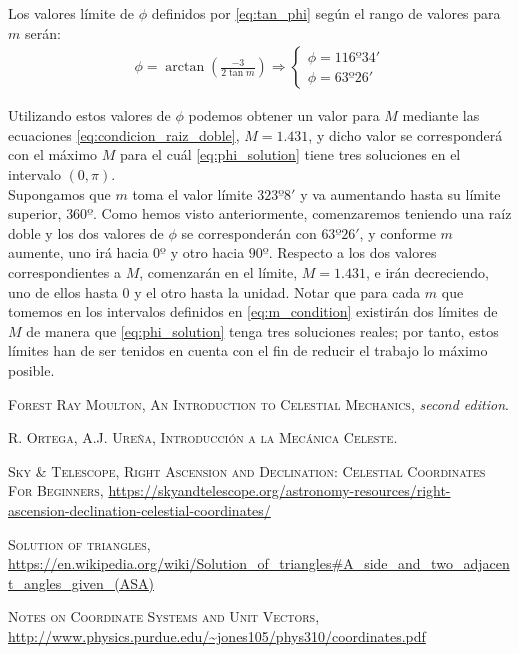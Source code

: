 \documentclass[11pt]{article}
\newcommand\ddfrac[2]{\frac{\displaystyle #1}{\displaystyle #2}}
\begin{document}
Los valores límite de $\phi$ definidos por \eqref{eq:tan_phi} según el rango de valores para $m$ serán:
\begin{align}
\phi=\arctan{(\ddfrac{-3}{2\tan{m}})} \Longrightarrow
\left\{
\begin{array}{l}
	\phi=116º34'\\
	\phi=63º26'
\end{array}
\right.
\end{align}

Utilizando estos valores de $\phi$ podemos obtener un valor para $M$ mediante las ecuaciones \eqref{eq:condicion_raiz_doble}, $M=1.431$, y dicho valor se corresponderá con el máximo $M$ para el cuál \eqref{eq:phi_solution} tiene tres soluciones en el intervalo $(0,\pi)$.\\

Supongamos que $m$ toma el valor límite $323º8'$ y va aumentando hasta su límite superior, $360º$. Como hemos visto anteriormente, comenzaremos teniendo una raíz doble y los dos valores de $\phi$ se corresponderán con $63º26'$, y conforme $m$ aumente, uno irá hacia $0º$ y otro hacia $90º$. Respecto a los dos valores correspondientes a $M$, comenzarán en el límite, $M=1.431$, e irán decreciendo, uno de ellos hasta $0$ y el otro hasta la unidad. Notar que para cada $m$ que tomemos en los intervalos definidos en \eqref{eq:m_condition} existirán dos límites de $M$ de manera que \eqref{eq:phi_solution} tenga tres soluciones reales; por tanto, estos límites han de ser tenidos en cuenta con el fin de reducir el trabajo lo máximo posible.\\













\newpage

\begin{thebibliography}{99}
 \textsc{Forest Ray Moulton}, \textsc{An Introduction to Celestial Mechanics}, \textit{second edition}.

 \textsc{R. Ortega, A.J. Ureña}, \textsc{Introducción a la Mecánica Celeste}.

 \textsc{Sky \& Telescope}, \textsc{Right Ascension and Declination: Celestial Coordinates For Beginners}, \url{https://skyandtelescope.org/astronomy-resources/right-ascension-declination-celestial-coordinates/}

 \textsc{Solution of triangles}, \url{https://en.wikipedia.org/wiki/Solution_of_triangles#A_side_and_two_adjacent_angles_given_(ASA)}

 \textsc{Notes on Coordinate Systems and Unit Vectors}, \url{http://www.physics.purdue.edu/~jones105/phys310/coordinates.pdf}

\end{thebibliography}
\end{document}
